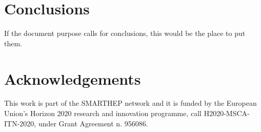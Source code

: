 \documentclass{smarthepnote}
\begin{document}
\section{Conclusions}
If the document purpose calls for conclusions, this would be the place to put them.

\section{Acknowledgements}
This work is part of the SMARTHEP network and it is funded by the European Union’s Horizon 2020 research and innovation programme, call H2020-MSCA-ITN-2020, under Grant Agreement n. 956086. 



\end{document}
